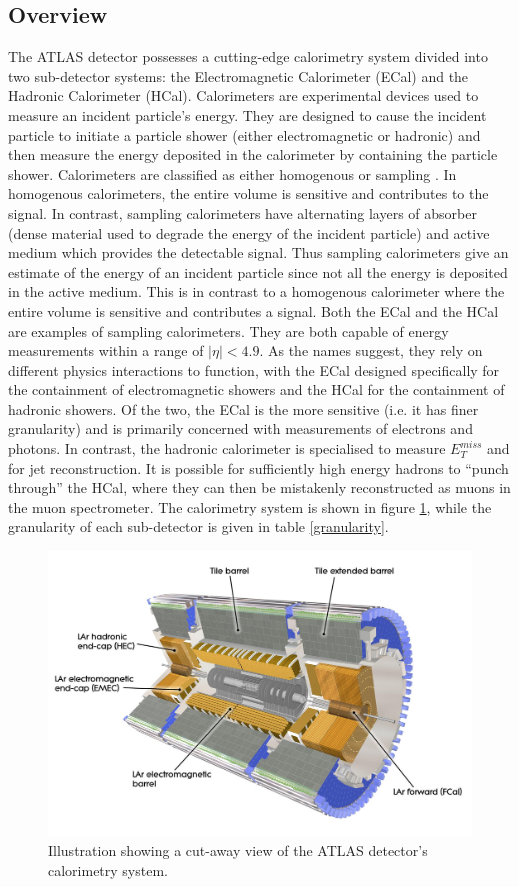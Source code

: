 \subsection{Overview}
The ATLAS detector possesses a cutting-edge calorimetry system \cite{ATLAS} divided into two sub-detector systems: the Electromagnetic Calorimeter (ECal) and the Hadronic Calorimeter (HCal). Calorimeters are experimental devices used to measure an incident particle's energy. They are designed to cause the incident particle to initiate a particle shower (either electromagnetic or hadronic) and then measure the energy deposited in the calorimeter by containing the particle shower. Calorimeters are classified as either homogenous or sampling \cite{PDG}. In homogenous calorimeters, the entire volume is sensitive and contributes to the signal. In contrast, sampling calorimeters have alternating layers of absorber (dense material used to degrade the energy of the incident particle) and active medium which provides the detectable signal. Thus sampling calorimeters give an estimate of the energy of an incident particle since not all the energy is deposited in the active medium. This is in contrast to a homogenous calorimeter where the entire volume is sensitive and contributes a signal. Both the ECal and the HCal are examples of sampling calorimeters. They are both capable of energy measurements within a range of $| \eta | < 4.9$. As the names suggest, they rely on different physics interactions to function, with the ECal designed specifically for the containment of electromagnetic showers and the HCal for the containment of hadronic showers. Of the two, the ECal is the more sensitive (i.e. it has finer granularity) and is primarily concerned with measurements of electrons and photons. In contrast, the hadronic calorimeter is specialised to measure $E_{T}^{miss}$ and for jet reconstruction. It is possible for sufficiently high energy hadrons to ``punch through'' the HCal, where they can then be mistakenly reconstructed as muons in the muon spectrometer. The calorimetry system is shown in figure \ref{calorimeter}, while the granularity of each sub-detector is given in table \ref{granularity}.
\begin{figure}
\centering
\includegraphics[scale=0.5]{images/image_calorimeter.jpg}
\caption{Illustration showing a cut-away view of the ATLAS detector's calorimetry system. \cite{ATLAS}}
\label{calorimeter}
\end{figure}
